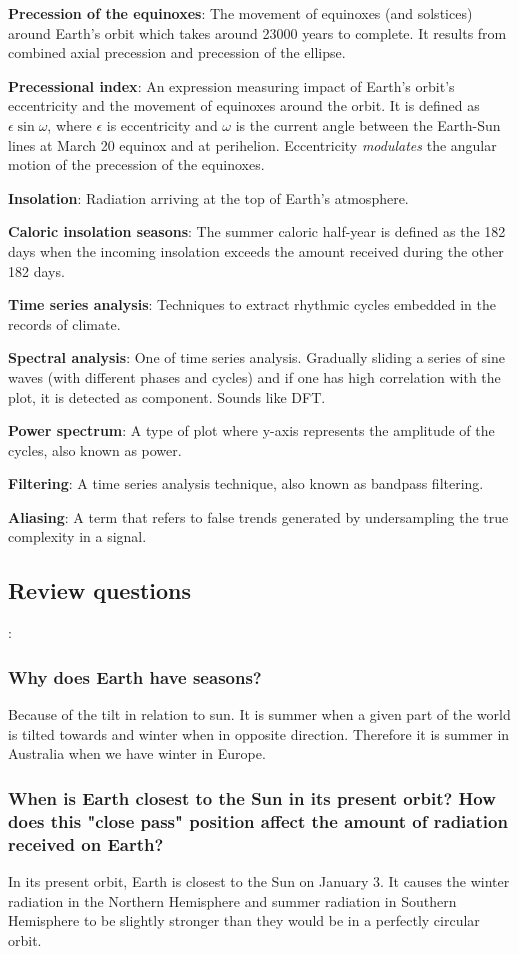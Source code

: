 \textbf{Precession of the equinoxes}: The movement of equinoxes (and solstices)
around Earth's orbit which takes around 23000 years to complete. It results
from combined axial precession and precession of the ellipse.

\textbf{Precessional index}: An expression measuring impact of Earth's orbit's
eccentricity and the movement of equinoxes around the orbit. It is defined as
$\epsilon \sin \omega$, where $\epsilon$ is eccentricity and $\omega$ is the
current angle between the Earth-Sun lines at March 20 equinox and at
perihelion. Eccentricity \textit{modulates} the angular motion of the
precession of the equinoxes.

\textbf{Insolation}: Radiation arriving at the top of Earth's atmosphere.

\textbf{Caloric insolation seasons}: The summer caloric half-year is defined as
the 182 days when the incoming insolation exceeds the amount received during
the other 182 days.

\textbf{Time series analysis}: Techniques to extract rhythmic cycles embedded
in the records of climate.

\textbf{Spectral analysis}: One of time series analysis. Gradually sliding a
series of sine waves (with different phases and cycles) and if one has high
correlation with the plot, it is detected as component. Sounds like DFT.

\textbf{Power spectrum}: A type of plot where y-axis represents the amplitude
of the cycles, also known as power.

\textbf{Filtering}: A time series analysis technique, also known as bandpass
filtering.

\textbf{Aliasing}: A term that refers to false trends generated by
undersampling the true complexity in a signal.

\subsection{Review questions}:

\subsubsection{Why does Earth have seasons?}
Because of the tilt in relation to sun. It is summer when a given part of the
world is tilted towards and winter when in opposite direction. Therefore it is
summer in Australia when we have winter in Europe.

\subsubsection{When is Earth closest to the Sun in its present orbit? How does
this "close pass" position affect the amount of radiation received on Earth?}
In its present orbit, Earth is closest to the Sun on January 3. It causes the
winter radiation in the Northern Hemisphere and summer radiation in Southern
Hemisphere to be slightly stronger than they would be in a perfectly circular
orbit.

